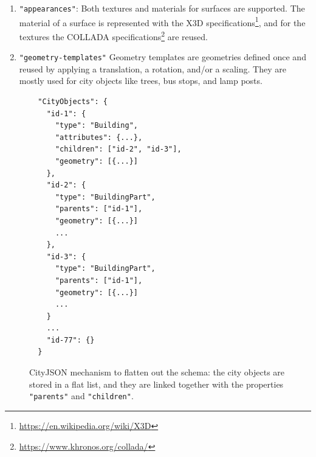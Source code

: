 \documentclass{isprs} %
\newcommand{\eg}{eg}
\begin{document}
\begin{enumerate}
  There are several advantages to this approach.
  First, the files can be compressed: 3D vertices are often shared by several surfaces, and repeating them can be costly, especially if they are very precise (sub-millimetre precision is often used).
  Second, this approach increases the topological relationships that are explicitly stored in the file, and several operations (\eg\ are 2 buildings adjacent?) can be sped up and made more robust.
  Third, it is very easy to convert to a representation listing all coordinates; the inverse is not true. 
  However, this list of vertices is the reason why the streaming of geometries is problematic, since in practice it can contain several millions vertices.
  To be able to reconstruct one Building, all the \texttt{"vertices"} need to be in memory, which can mean waiting for millions of unused vertices to be deserialised.
  \item \texttt{"appearances"}: Both textures and materials for surfaces are supported.  
  The material of a surface is represented with the X3D specifications\footnote{\url{https://en.wikipedia.org/wiki/X3D}}, and for the textures the COLLADA specifications\footnote{\url{https://www.khronos.org/collada/}} are reused.
  \item \texttt{"geometry-templates"} 
  Geometry templates are geometries defined once and reused by applying a translation, a rotation, and/or a scaling.
  They are mostly used for city objects like trees, bus stops, and lamp posts. 
\end{enumerate}


\begin{figure}
  \centering
\begin{lstlisting}
  "CityObjects": {
    "id-1": {
      "type": "Building",
      "attributes": {...},
      "children": ["id-2", "id-3"],
      "geometry": [{...}]
    },
    "id-2": {
      "type": "BuildingPart",
      "parents": ["id-1"],
      "geometry": [{...}]
      ...
    },
    "id-3": {
      "type": "BuildingPart",
      "parents": ["id-1"],
      "geometry": [{...}]
      ...
    }
    ...
    "id-77": {}
  }
\end{lstlisting}
  \caption{CityJSON mechanism to flatten out the schema: the city objects are stored in a flat list, and they are linked together with the properties \texttt{"parents"} and \texttt{"children"}.}%
\label{fig:parents_children}
\end{figure}




%
\end{document}
